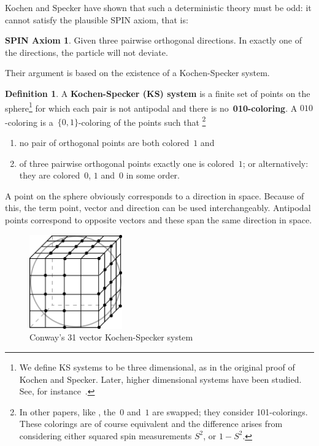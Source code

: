 \documentclass[adraft,copyright,creativecommons]{eptcs}
\newcommand{\keyword}[1]{\textbf{#1}}
\newcounter{main}
\theoremstyle{definition}
\newtheorem{dfn}[main]{Definition}
\newtheorem*{spin}{SPIN Axiom \cite{ck09}}
\theoremstyle{remark}
\begin{document}
Kochen and Specker have shown that such a deterministic theory must
be odd: it cannot satisfy the plausible SPIN axiom, that is:
\begin{spin}
    Given three pairwise orthogonal directions.
    In exactly one of the directions, the particle will not deviate.
\end{spin}
Their argument is based on the existence of a Kochen-Specker system.
\begin{dfn}
    A \keyword{Kochen-Specker (KS) system} is
    a finite set of points on the sphere\footnote{
            We define KS systems to be three dimensional,
            as in the original proof of Kochen and Specker.
            Later, higher dimensional systems have been studied.
            See, for instance~\cite[p.~201]{qtcm}.
        }
    for which each pair is not antipodal and
    there is no~\keyword{010-coloring}.
    A $010$-coloring is a~$\{0,1\}$-coloring of the points such that%
        \footnote{
                In other papers, like \cite{aow11},
                the~$0$ and~$1$ are swapped; they consider 101-colorings.
                These colorings are of course equivalent and the
                difference arises from considering either squared
                spin measurements $S^2$, or $1-S^2$.
               	}
    \begin{enumerate}
        \item
            no pair of orthogonal points are both colored~$1$ and
        \item
            of three pairwise orthogonal points exactly one is colored~$1$;
            or alternatively: they are colored~$0$, $1$ and~$0$ in some order.
    \end{enumerate}
\end{dfn}
A point on the sphere obviously corresponds to a direction in space.
Because of this, the term point, vector and direction
can be used interchangeably. Antipodal points correspond to opposite
vectors and these span the same direction in space.

\begin{figure}
\begin{center}
\includegraphics[width=40mm]{../graphs/ks31.pdf}
\end{center}
\caption{Conway's 31 vector Kochen-Specker system
\label{fig:conway31}}
\end{figure}
\end{document}
